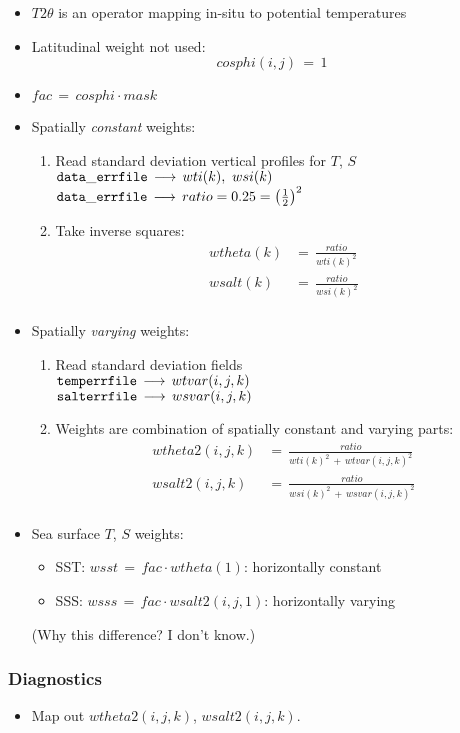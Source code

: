 \begin{itemize}
%
\item
$T2\theta$ is an operator mapping in-situ to potential temperatures
%
\item
Latitudinal weight not used:
\[
cosphi(i,j) \, = \, 1
\]
%
\item
$ fac \, = \, cosphi \cdot mask $
%
\item
Spatially {\it constant} weights:
%
\begin{enumerate}
%
\item
Read standard deviation vertical profiles for $T$, $S$ \\
$ {\tt data\_errfile} \, \longrightarrow \, 
wti(k), \,\, wsi(k) $ \\
$ {\tt data\_errfile} \, \longrightarrow \, 
ratio = 0.25 = \left( \frac{1}{2} \right)^2 $
%
\item
Take inverse squares:
\[
\begin{aligned}
wtheta(k) & = \, \frac{ratio}{wti(k)^2} \\
wsalt(k) & = \, \frac{ratio}{wsi(k)^2} \\
\end{aligned}
\]
%
\end{enumerate}
%
\item
Spatially {\it varying} weights:
%
\begin{enumerate}
%
\item
Read standard deviation fields \\
$ {\tt temperrfile} \, \longrightarrow \, wtvar(i,j,k) $ \\
$ {\tt salterrfile} \, \longrightarrow \, wsvar(i,j,k) $ \\
%
\item
Weights are combination of spatially constant and varying parts:
\[
\begin{aligned}
wtheta2(i,j,k) & = \, \frac{ratio}
{wti(k)^2 \, + \,wtvar(i,j,k)^2 } \\
wsalt2(i,j,k) & = \, 
\frac{ratio}
{wsi(k)^2 \, + \,wsvar(i,j,k)^2 } \\
\end{aligned}
\]
%
\end{enumerate}
%
\item
Sea surface $T$, $S$ weights:
\begin{itemize}
\item
SST: $ wsst \, = \, fac \cdot wtheta(1)$: horizontally constant
\item
SSS: $ wsss \, = \, fac \cdot wsalt2(i,j,1)$: horizontally varying
\end{itemize}
(Why this difference? I don't know.)
%
\end{itemize}


\subsubsection{Diagnostics}

\begin{itemize}
%
\item
Map out $wtheta2(i,j,k)$, $wsalt2(i,j,k)$.

%
\end{itemize}

